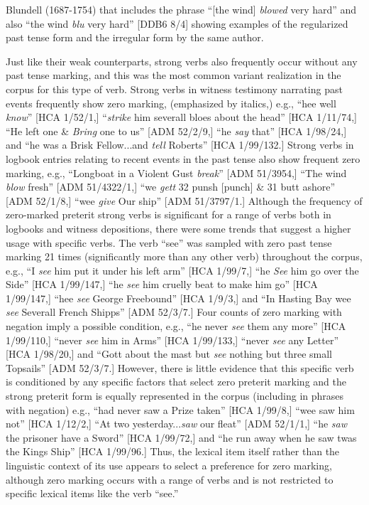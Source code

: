 \begin{styleStandard}
Blundell (1687-1754) that includes the phrase “[the wind] \textit{blowed} very hard” and also “the wind \textit{blu} very hard” [DDB6 8/4] showing examples of the regularized past tense form and the irregular form by the same author. 
\end{styleStandard}


\begin{styleStandard}
Just like their weak counterparts, strong verbs also frequently occur without any past tense marking, and this was the most common variant realization in the corpus for this type of verb. Strong verbs in witness testimony narrating past events frequently show zero marking, (emphasized by italics,) e.g., “hee well\textit{ know}” [HCA 1/52/1,] “\textit{strike} him severall bloes about the head” [HCA 1/11/74,] “He left one \&\textit{ Bring} one to us” [ADM 52/2/9,] “he \textit{say} that” [HCA 1/98/24,] and “he was a Brisk Fellow...and\textit{ tell} Roberts” [HCA 1/99/132.] Strong verbs in logbook entries relating to recent events in the past tense also show frequent zero marking, e.g., “Longboat in a Violent Gust \textit{break}” [ADM 51/3954,] “The wind \textit{blow} fresh” [ADM 51/4322/1,] “we \textit{gett} 32 punsh [punch] \& 31 butt ashore” [ADM 52/1/8,] “wee \textit{give} Our ship” [ADM 51/3797/1.] Although the frequency of zero-marked preterit strong verbs is significant for a range of verbs both in logbooks and witness depositions, there were some trends that suggest a higher usage with specific verbs. The verb “see” was sampled with zero past tense marking 21 times (significantly more than any other verb) throughout the corpus, e.g., “I \textit{see} him put it under his left arm” [HCA 1/99/7,] “he \textit{See} him go over the Side” [HCA 1/99/147,] “he\textit{ see} him cruelly beat to make him go” [HCA 1/99/147,] “hee \textit{see} George Freebound” [HCA 1/9/3,] and “In Hasting Bay wee \textit{see} Severall French Shipps” [ADM 52/3/7.] Four counts of zero marking with negation imply a possible condition, e.g., “he never \textit{see} them any more” [HCA 1/99/110,] “never\textit{ see} him in Arms” [HCA 1/99/133,] “never\textit{ see} any Letter” [HCA 1/98/20,] and “Gott about the mast but \textit{see} nothing but three small Topsails” [ADM 52/3/7.] However, there is little evidence that this specific verb is conditioned by any specific factors that select zero preterit marking and the strong preterit form is equally represented in the corpus (including in phrases with negation) e.g., “had never saw a Prize taken” [HCA 1/99/8,] “wee saw him not” [HCA 1/12/2,] “At two yesterday...\textit{saw} our fleat” [ADM 52/1/1,] “he \textit{saw} the prisoner have a Sword” [HCA 1/99/72,] and “he run away when he saw twas the Kings Ship” [HCA 1/99/96.] Thus, the lexical item itself rather than the linguistic context of its use appears to select a preference for zero marking, although zero marking occurs with a range of verbs and is not restricted to specific lexical items like the verb “see.”
\end{styleStandard}


